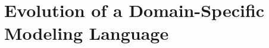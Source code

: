 \chapter{Evolution of a Domain-Specific Modeling Language}
\label{chap:iterative-dsl-evolution}












